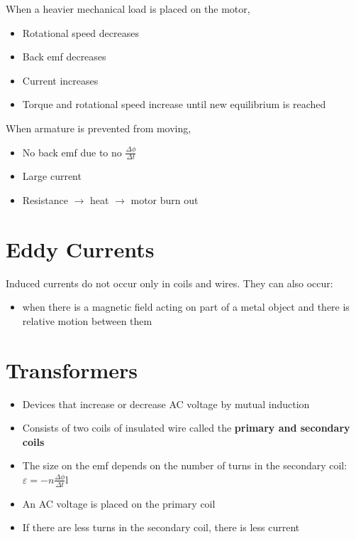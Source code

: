 	When a heavier mechanical load is placed on the motor,

	\begin{itemize}
		\item Rotational speed decreases
		\item Back emf decreases
		\item Current increases
		\item Torque and rotational speed increase until new equilibrium is reached
	\end{itemize}

	When armature is prevented from moving,
	\begin{itemize}
		\item No back emf due to no $\frac{\Delta \phi}{\Delta t}$
		\item Large current
		\item Resistance $\rightarrow$ heat $\rightarrow$ motor burn out
	\end{itemize}

\section{Eddy Currents} \label{12/03/2025}

	Induced currents do not occur only in coils and wires. They can also occur:

	\begin{itemize}
		\item when there is a magnetic field acting on part of a metal object and there is relative motion between them
	\end{itemize}

\section{Transformers}

	\begin{itemize}
		\item Devices that increase or decrease AC voltage by mutual induction
		\item Consists of two coils of insulated wire called the \textbf{primary and secondary coils}
		\item The size on the emf depends on the number of turns in the secondary coil: $\varepsilon = -n \frac{\Delta \phi}{\Delta t}$l
		\item An AC voltage is placed on the primary coil
		\item If there are less turns in the secondary coil, there is less current
	\end{itemize}


